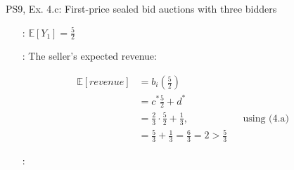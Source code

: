\begin{frame}{PS9, Ex. 4.c: First-price sealed bid auctions with three bidders}
\begin{multicols}{2}
\begin{itemize}
        \item[\nth{1}:] $\mathbb{E}[Y_1]=\frac{5}{2}$
        \item[\nth{2}:] The seller's expected revenue:
      \end{itemize} \vspace{-12pt}
      \begin{align*}
        \mathbb{E}[revenue]&=b_i\left(\frac{5}{2}\right)\\
                           &= c^*\frac{5}{2}+d^*\\
                           &= \frac{2}{3}\cdot\frac{5}{2}+\frac{1}{3},&&\text{using (4.a)}\\
                           &= \frac{5}{3}+\frac{1}{3}=\frac{6}{3}=2>\frac{5}{3}
      \end{align*}\vspace{-22pt}
      \begin{itemize}
        \item[\nth{3}:] 
      \end{itemize}
      \vfill\null
    \end{multicols}
    \vfill\null
\end{frame}
